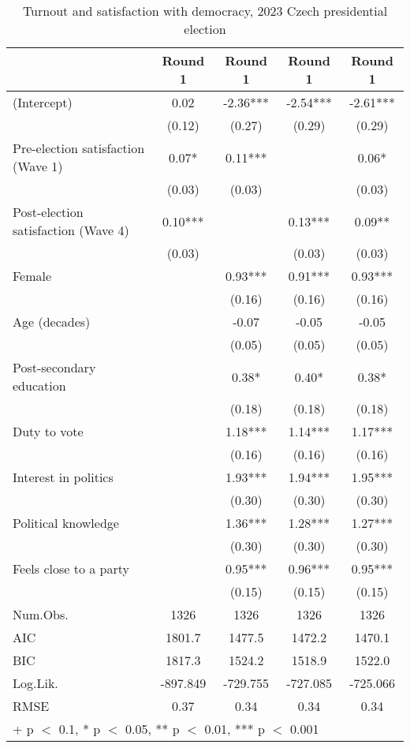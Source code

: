 \begin{table}

\caption{\label{tab:unnamed-chunk-4}Turnout and satisfaction with democracy, 2023 Czech presidential election}
\centering
\begin{tabular}[t]{lcccc}
\toprule
  & Round 1 & Round 1  & Round 1   & Round 1   \\
\midrule
(Intercept) & 0.02 & -2.36*** & -2.54*** & -2.61***\\
 & (0.12) & (0.27) & (0.29) & (0.29)\\
Pre-election satisfaction (Wave 1) & 0.07* & 0.11*** &  & 0.06*\\
 & (0.03) & (0.03) &  & (0.03)\\
Post-election satisfaction (Wave 4) & 0.10*** &  & 0.13*** & 0.09**\\
 & (0.03) &  & (0.03) & (0.03)\\
Female &  & 0.93*** & 0.91*** & 0.93***\\
 &  & (0.16) & (0.16) & \vphantom{1} (0.16)\\
Age (decades) &  & -0.07 & -0.05 & -0.05\\
 &  & (0.05) & (0.05) & (0.05)\\
Post-secondary education &  & 0.38* & 0.40* & 0.38*\\
 &  & (0.18) & (0.18) & (0.18)\\
Duty to vote &  & 1.18*** & 1.14*** & 1.17***\\
 &  & (0.16) & (0.16) & (0.16)\\
Interest in politics &  & 1.93*** & 1.94*** & 1.95***\\
 &  & (0.30) & (0.30) & \vphantom{1} (0.30)\\
Political knowledge &  & 1.36*** & 1.28*** & 1.27***\\
 &  & (0.30) & (0.30) & (0.30)\\
Feels close to a party &  & 0.95*** & 0.96*** & 0.95***\\
 &  & (0.15) & (0.15) & (0.15)\\
\midrule
Num.Obs. & 1326 & 1326 & 1326 & 1326\\
AIC & 1801.7 & 1477.5 & 1472.2 & 1470.1\\
BIC & 1817.3 & 1524.2 & 1518.9 & 1522.0\\
Log.Lik. & -897.849 & -729.755 & -727.085 & -725.066\\
RMSE & 0.37 & 0.34 & 0.34 & 0.34\\
\bottomrule
\multicolumn{5}{l}{\rule{0pt}{1em}+ p $<$ 0.1, * p $<$ 0.05, ** p $<$ 0.01, *** p $<$ 0.001}\\
\end{tabular}
\end{table}

